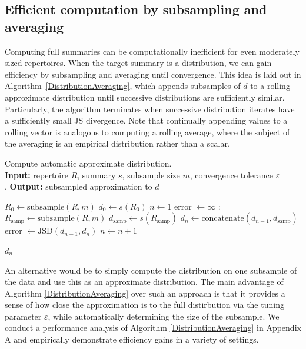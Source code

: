 \documentclass{article}
\begin{document}
\subsection*{Efficient computation by subsampling and averaging}
Computing full summaries can be computationally inefficient for even moderately sized repertoires.
When the target summary is a distribution, we can gain efficiency by subsampling and averaging until convergence.
This idea is laid out in Algorithm~\ref{DistributionAveraging}, which appends subsamples of $d$ to a rolling approximate distribution until successive distributions are sufficiently similar.
Particularly, the algorithm terminates when successive distribution iterates have a sufficiently small JS divergence.
Note that continually appending values to a rolling vector is analogous to computing a rolling average, where the subject of the averaging is an empirical distribution rather than a scalar.
\begin{algorithm}
    \caption{Compute automatic approximate distribution.\\
        \textbf{Input:} repertoire $R$, summary $s$, subsample size $m$, convergence tolerance $\varepsilon$\\.
        \textbf{Output:} subsampled approximation to $d$}
    \label{DistributionAveraging}
    \begin{algorithmic}
        \State $R_0 \gets \text{subsample}(R, m)$
        \State $d_0 \gets s(R_0)$
        \State $n \gets 1$
        \State error $\gets \infty$
        :
        \State $R_\text{samp} \gets \text{subsample}(R, m)$
        \State $d_\text{samp} \gets s(R_\text{samp})$
        \State $d_n \gets \text{concatenate}(d_{n-1}, d_\text{samp})$
        \State error $\gets \text{JSD}(d_{n-1}, d_n)$
        \State $n \gets n + 1$
        \EndWhile
    \end{algorithmic}
    \Return $d_n$
\end{algorithm}

An alternative would be to simply compute the distribution on one subsample of the data and use this as an approximate distribution.
The main advantage of Algorithm \ref{DistributionAveraging} over such an approach is that it provides a sense of how close the approximation is to the full distirbution via the tuning parameter $\varepsilon$, while automatically determining the size of the subsample.
We conduct a performance analysis of Algorithm \ref{DistributionAveraging} in Appendix A and empirically demonstrate efficiency gains in a variety of settings.
\end{document}
